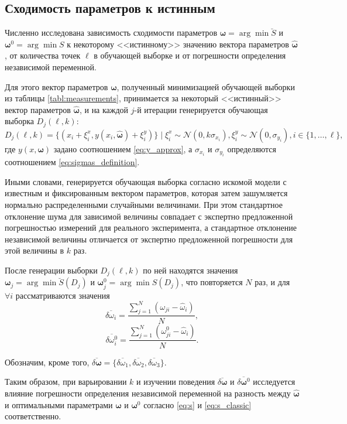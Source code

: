 \documentclass[tikz,10pt,a4paper]{article}
\newcommand{\bomega}{\boldsymbol{\omega}}
\begin{document}
\subsection{Сходимость параметров к истинным}
Численно исследована зависимость сходимости параметров $\bomega = \arg \min \breve{S}$
и $\bomega^0 = \arg \min S$ к некоторому <<истинному>> значению вектора параметров
$\hat{\bomega}$, от количества точек $\ell$ в обучающей выборке и от погрешности определения
независимой переменной.

Для этого вектор параметров $\bomega$, полученный минимизацией обучающей выборки из таблицы
\ref{tabl:measurements}, принимается за некоторый <<истинный>> вектор параметров $\hat{\bomega}$,
и на каждой $j$-й итерации генерируется обучающая выборка $D_j(\ell, k)$:
\[
  D_j(\ell, k) = \{ (x_i + \xi^x_i, y(x_i, \hat{\bomega}) + \xi^y_i) \} \mid \xi^x_i \sim \mathcal{N}(0, k \sigma_{x_i}), \xi^y_i \sim \mathcal{N}(0, \sigma_{y_i}), i \in \{ 1, \dots, \ell \},
\]
где $y(x, \bomega)$ задано соотношением \eqref{eq:y_approx}, а $\sigma_{x_i}$ и $\sigma_{y_i}$
определяются соотношением \eqref{eq:sigmas_definition}.

Иными словами, генерируется обучающая выборка согласно искомой модели с
известным и фиксированным вектором параметров, которая затем зашумляется нормально
распределенными случайными величинами. При этом стандартное отклонение
шума для зависимой величины совпадает с экспертно предложенной погрешностью
измерений для реального эксперимента, а стандартное отклонение независимой
величины отличается от экспертно предложенной погрешности для этой величины
в $k$ раз.

После генерации выборки $D_j(\ell, k)$ по ней находятся значения $\bomega_j = \arg \min \breve{S}(D_j)$
и $\bomega_j^0 = \arg \min S(D_j)$, что повторяется $N$ раз, и для $\forall i$ рассматриваются значения
\[
  \overline{\delta \omega_i} = \frac{\sum_{j = 1}^N (\omega_{ji} - \hat{\omega}_i)}{N},
\]
\[
  \overline{\delta \omega^0_i} = \frac{\sum_{j = 1}^N (\omega^0_{ji} - \hat{\omega}_i)}{N}.
\]

Обозначим, кроме того, $\overline{\delta \bomega} = \{ \overline{\delta \omega_1}, \overline{\delta \omega_2}, \overline{\delta \omega_3} \}$.

Таким образом, при варьировании $k$ и изучении поведения $\overline{\delta \bomega}$ и
$\overline{\delta \bomega^0}$ исследуется влияние погрешности определения
независимой переменной на разность между $\hat{\bomega}$ и оптимальными
параметрами $\bomega$ и $\bomega^0$ согласно \eqref{eq:s} и \eqref{eq:s_classic}
соответственно.
\end{document}
